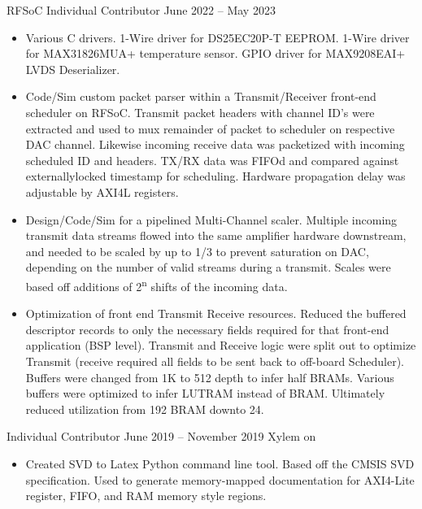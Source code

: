 \documentclass[10pt,final,sans]{resume}
\begin{document}
 { RFSoC Individual Contributor  } { June 2022 -- May 2023 }
\begin{itemize}
  \item Various C drivers. 1-Wire driver for DS25EC20P-T EEPROM. 1-Wire driver for MAX31826MUA+ temperature sensor. GPIO driver for MAX9208EAI+ LVDS Deserializer.
  \item Code/Sim custom packet parser within a Transmit/Receiver front-end scheduler on RFSoC. Transmit packet headers with channel ID's were extracted and used to mux remainder of packet to scheduler on respective DAC channel. Likewise incoming receive data was packetized with incoming scheduled ID and headers. TX/RX data was FIFOd and compared against externallylocked timestamp for scheduling. Hardware propagation delay was adjustable by AXI4L registers.
  \item Design/Code/Sim for a pipelined Multi-Channel scaler. Multiple incoming transmit data streams flowed into the same amplifier hardware downstream, and needed to be scaled by up to 1/3 to prevent saturation on DAC, depending on the number of valid streams during a transmit. Scales were based off additions of 2\textsuperscript{n} shifts of the incoming data.
  \item Optimization of front end Transmit Receive resources. Reduced the buffered descriptor records to only the necessary fields required for that front-end application (BSP level). Transmit and Receive logic were split out to optimize Transmit (receive required all fields to be sent back to off-board Scheduler). Buffers were changed from 1K to 512 depth to infer half BRAMs. Various buffers were optimized to infer LUTRAM instead of BRAM. Ultimately reduced utilization from 192 BRAM downto 24.
\end{itemize}


 { Individual Contributor } { June 2019 -- November 2019 }
Xylem on 
\begin{itemize}
  \item Created SVD to Latex Python command line tool. Based off the CMSIS SVD specification. Used to generate memory-mapped documentation for AXI4-Lite register, FIFO, and RAM memory style regions.
\end{itemize}
\end{document}
